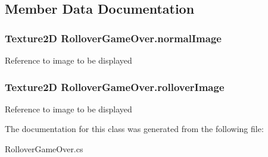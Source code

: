 \subsection{Member Data Documentation}
\hypertarget{class_rollover_game_over_ab3bb0aa666cbb2d3d5b75de7915bbaed}{
\subsubsection[{normal\-Image}]{\setlength{\rightskip}{0pt plus 5cm}Texture2\-D Rollover\-Game\-Over.\-normal\-Image}}\label{class_rollover_game_over_ab3bb0aa666cbb2d3d5b75de7915bbaed}
Reference to image to be displayed \hypertarget{class_rollover_game_over_a604a75ebfbcb070218d1584955d5fe76}{
\subsubsection[{rollover\-Image}]{\setlength{\rightskip}{0pt plus 5cm}Texture2\-D Rollover\-Game\-Over.\-rollover\-Image}}\label{class_rollover_game_over_a604a75ebfbcb070218d1584955d5fe76}
Reference to image to be displayed 

The documentation for this class was generated from the following file\-:\begin{DoxyCompactItemize}
\item 
Rollover\-Game\-Over.\-cs\end{DoxyCompactItemize}
